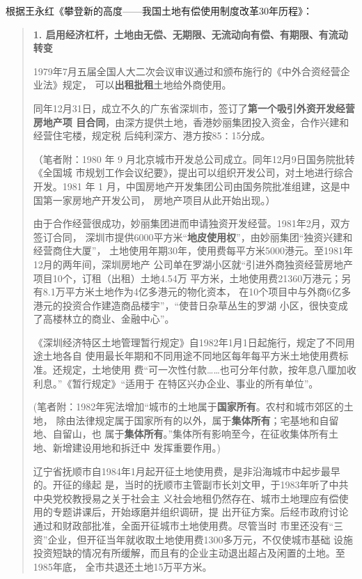 根据王永红《攀登新的高度——我国土地有偿使用制度改革30年历程》：
\begin{quotation}
  \textbf{1. 启用经济杠杆，土地由无偿、无期限、无流动向有偿、有期限、有流动转变}

  1979年7月五届全国人大二次会议审议通过和颁布施行的《中外合资经营企业法》规定，
  可以\textbf{出租批租}土地给外商使用。

  同年12月31日，成立不久的广东省深圳市，签订了\textbf{第一个吸引外资开发经营房地产项
    目合同}，由深方提供土地，香港妙丽集团投入资金，合作兴建和经营住宅楼，规定税
  后纯利深方、港方按85∶15分成。

  （笔者附：1980 年 9 月北京城市开发总公司成立。同年12月9日国务院批转《全国城
  市规划工作会议纪要》，提出可以组织开发公司，对土地进行综合开发。1981 年 1
  月，中国房地产开发集团公司由国务院批准组建，这是中国第一家房地产开发公司，
  房地产项目从此开始出现。）

  由于合作经营很成功，妙丽集团进而申请独资开发经营。1981年2月，双方签订合同，
  深圳市提供6000平方米“\textbf{地皮使用权}”，由妙丽集团“独资兴建和经营商住大厦”，
  土地使用年期30年，使用费每平方米5000港元。至1981年12月的两年间，深圳房地产
  公司单在罗湖小区就“引进外商独资经营房地产项目10个，订租（出租）土地4.54万
  平方米，土地使用费21360万港元；另有8.1万平方米土地作为4亿多港元的物化资本，
  在10个项目中与外商6亿多港元的投资合作建造商品楼宇”，“使昔日杂草丛生的罗湖
  小区，很快变成了高楼林立的商业、金融中心”。

  《深圳经济特区土地管理暂行规定》自1982年1月1日起施行，规定了不同用途土地各自
  使用最长年期和不同用途不同地区每年每平方米土地使用费标准。还规定，土地使用
  费“可一次性付款……也可分年付款，按年息八厘加收利息。”《暂行规定》“适用于
  在特区兴办企业、事业的所有单位”。

  (笔者附：1982年宪法增加“城市的土地属于\textbf{国家所有}。农村和城市郊区的土地，
  除由法律规定属于国家所有的以外，属于\textbf{集体所有}；宅基地和自留地、自留山，也
  属于\textbf{集体所有}。”集体所有影响至今，在征收集体所有土地、新增建设用地和拆迁中
  发挥重要作用。)

  辽宁省抚顺市自1984年1月起开征土地使用费，是非沿海城市中起步最早的。开征的缘起
  是，当时的抚顺市主管副市长刘文甲，于1983年听了中共中央党校教授易之关于社会主
  义社会地租仍然存在、城市土地理应有偿使用的专题讲课后，开始琢磨并组织调研，提
  出开征方案。后经市政府讨论通过和财政部批准，全面开征城市土地使用费。尽管当时
  市里还没有“三资”企业，但开征当年就收取土地使用费1300多万元，不仅使城市基础
  设施投资短缺的情况有所缓解，而且有的企业主动退出超占及闲置的土地。至1985年底，
  全市共退还土地15万平方米。


\end{quotation}
